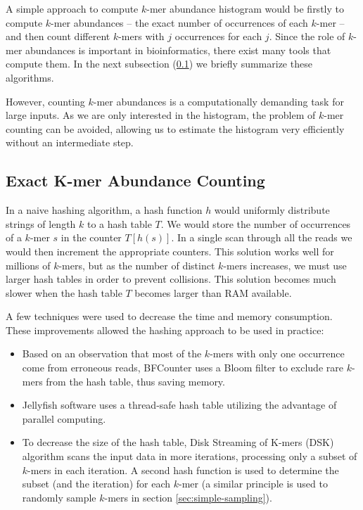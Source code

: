 A simple approach to compute $k$-mer abundance histogram would be firstly to compute $k$-mer
abundances -- the exact number of occurrences of each $k$-mer -- and then count different $k$-mers
with $j$ occurrences for each $j$. Since the role of $k$-mer abundances is important in
bioinformatics, there exist many tools that compute them. 
In the next subsection (\ref{sec:exact-algorithms}) we briefly summarize these algorithms.

However, counting $k$-mer abundances is a computationally demanding task for large inputs.
As we are only interested in the histogram, the problem of $k$-mer counting can be avoided,
allowing us to estimate the histogram very efficiently without an intermediate step.

\subsection{Exact K-mer Abundance Counting}
\label{sec:exact-algorithms}
In a naive hashing algorithm, a hash function $h$ would uniformly distribute strings of
length $k$ to a hash table $T$. We would store the number of occurrences of a $k$-mer
$s$ in the counter $T[h(s)]$. In a single scan through all the reads we
would then increment the appropriate counters. This solution works well for
millions of $k$-mers, but as the number of distinct $k$-mers increases,
we must use larger hash tables in order to prevent collisions.
This solution becomes much slower when the hash table $T$ becomes larger than RAM available.

A few techniques were used to decrease the time and memory consumption. 
These improvements allowed the hashing approach to be used in practice:

\begin{itemize}
\item Based on an observation that most of the $k$-mers with only one occurrence come from
erroneous reads, BFCounter \cite{Melsted2011} uses a Bloom filter to exclude rare $k$-mers
from the hash table, thus saving memory.

\item Jellyfish \cite{Marcais2011} software uses a thread-safe hash table utilizing the 
advantage of parallel computing.

\item To decrease the size of the hash table, Disk Streaming of K-mers (DSK) \cite{Rizk2013}
algorithm scans the input data in more iterations, processing only a subset of $k$-mers
in each iteration. A second hash function is used to determine the subset (and the iteration) 
for each $k$-mer (a similar principle is used to randomly sample $k$-mers 
in section \ref{sec:simple-sampling}).
\end{itemize}

